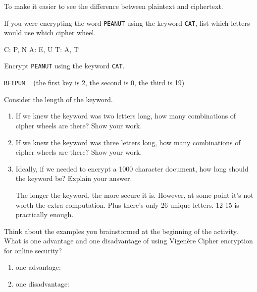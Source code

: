 \begin{answer}
To make it easier to see the difference between plaintext and ciphertext.
\end{answer}


\Q If you were encrypting the word \texttt{PEANUT} using the keyword \texttt{CAT}, list which letters would use which cipher wheel.

\begin{answer}
\centering
C: P, N
\hspace{3em}
A: E, U
\hspace{3em}
T: A, T
\end{answer}


\Q Encrypt \texttt{PEANUT} using the keyword \texttt{CAT}.

\begin{answer}
\texttt{RETPUM} ~ (the first key is 2, the second is 0, the third is 19)
\end{answer}


\Q Consider the length of the keyword.

\begin{enumerate}

\item If we knew the keyword was two letters long, how many combinations of cipher wheels are there?
Show your work.


\item If we knew the keyword was three letters long, how many combinations of cipher wheels are there?
Show your work.


\item Ideally, if we needed to encrypt a 1000 character document, how long should the keyword be?
Explain your answer.

\begin{answer}
The longer the keyword, the more secure it is.
However, at some point it's not worth the extra computation.
Plus there's only 26 unique letters. 12-15 is practically enough.
\end{answer}

\end{enumerate}


\Q Think about the examples you brainstormed at the beginning of the activity.
What is one advantage and one disadvantage of using Vigenère Cipher encryption for online security?

\begin{enumerate}

\item one advantage:


\item one disadvantage:


\end{enumerate}
